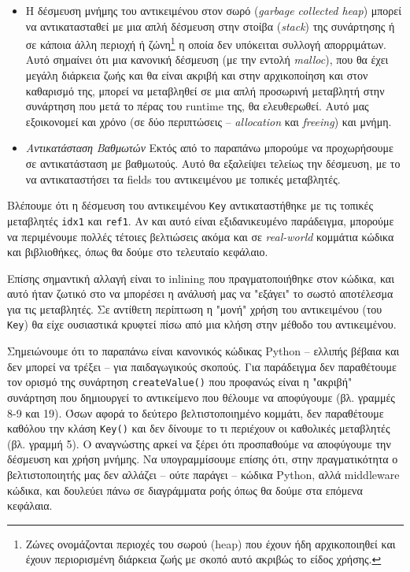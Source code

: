 \begin{itemize}

\item Η δέσμευση μνήμης του αντικειμένου στον σωρό (\textit{garbage collected
heap}) μπορεί να αντικατασταθεί με μια απλή δέσμευση στην στοίβα
(\textit{stack}) της συνάρτησης ή σε κάποια άλλη περιοχή ή ζώνη\footnote{Ζώνες
ονομάζονται περιοχές του σωρού (heap) που έχουν ήδη αρχικοποιηθεί και έχουν
περιορισμένη διάρκεια ζωής με σκοπό αυτό ακριβώς το είδος χρήσης.} η οποία δεν
υπόκειται συλλογή απορριμάτων. Αυτό σημαίνει ότι μια κανονική δέσμευση (με την
εντολή \textit{malloc}), που θα έχει μεγάλη διάρκεια ζωής και θα είναι ακριβή
και στην αρχικοποίηση και στον καθαρισμό της, μπορεί να μεταβληθεί σε μια απλή
προσωρινή μεταβλητή στην συνάρτηση που μετά το πέρας του runtime της, θα
ελευθερωθεί. Αυτό μας εξοικονομεί και χρόνο (σε δύο περιπτώσεις –
\textit{allocation} και \textit{freeing}) και μνήμη.

\item \textit{Αντικατάσταση Βαθμωτών} Εκτός από το παραπάνω μπορούμε
να προχωρήσουμε σε αντικατάσταση με βαθμωτούς. Αυτό θα εξαλείψει τελείως την
δέσμευση, με το να αντικαταστήσει τα fields του αντικειμένου με τοπικές
μεταβλητές.

\end{itemize}

Βλέπουμε ότι η δέσμευση του αντικειμένου \texttt{Key} αντικαταστήθηκε με τις
τοπικές μεταβλητές \texttt{idx1} και \texttt{ref1}. Αν και αυτό είναι
εξιδανικευμένο παράδειγμα, μπορούμε να περιμένουμε πολλές τέτοιες βελτιώσεις
ακόμα και σε \textit{real-world} κομμάτια κώδικα και βιβλιοθήκες, όπως θα δούμε
στο τελευταίο κεφάλαιο.

Επίσης σημαντική αλλαγή είναι το inlining που πραγματοποιήθηκε στον κώδικα, και
αυτό ήταν ζωτικό στο να μπορέσει η ανάλυσή μας να "εξάγει" το σωστό αποτέλεσμα
για τις μεταβλητές. Σε αντίθετη περίπτωση η "μονή" χρήση του αντικειμένου (του
\texttt{Key}) θα είχε ουσιαστικά κρυφτεί πίσω από μια κλήση στην μέθοδο του
αντικειμένου.

Σημειώνουμε ότι  το παραπάνω είναι κανονικός κώδικας Python – ελλιπής βέβαια και
δεν μπορεί να τρέξει – για παιδαγωγικούς σκοπούς. Για παράδειγμα δεν παραθέτουμε
τον ορισμό της συνάρτηση \texttt{createValue()} που προφανώς είναι η "ακριβή"
συνάρτηση που δημιουργεί το αντικείμενο που θέλουμε να αποφύγουμε (βλ. γραμμές
8-9 και 19). Όσων αφορά το δεύτερο βελτιστοποιημένο κομμάτι, δεν παραθέτουμε
καθόλου την κλάση \texttt{Key()} και δεν δίνουμε το τι περιέχουν οι καθολικές
μεταβλητές (βλ. γραμμή 5). Ο αναγνώστης αρκεί να ξέρει ότι προσπαθούμε να
αποφύγουμε την δέσμευση και χρήση μνήμης. Να υπογραμμίσουμε επίσης ότι, στην
πραγματικότητα ο βελτιστοποιητής μας δεν αλλάζει – ούτε παράγει – κώδικα Python,
αλλά middleware κώδικα, και δουλεύει πάνω σε διαγράμματα ροής όπως θα δούμε στα
επόμενα κεφάλαια.

